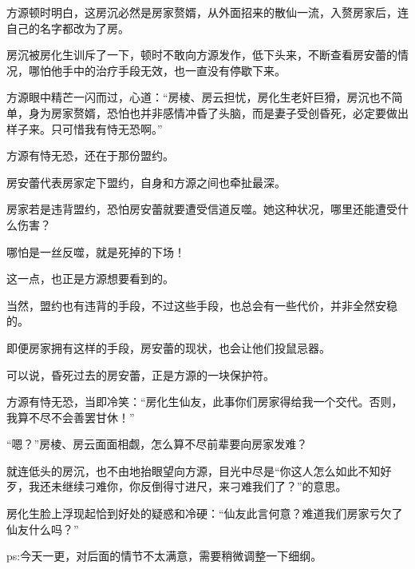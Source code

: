 \begin{this_body}
方源顿时明白，这房沉必然是房家赘婿，从外面招来的散仙一流，入赘房家后，连自己的名字都改为了房。

房沉被房化生训斥了一下，顿时不敢向方源发作，低下头来，不断查看房安蕾的情况，哪怕他手中的治疗手段无效，也一直没有停歇下来。

方源眼中精芒一闪而过，心道：“房棱、房云担忧，房化生老奸巨猾，房沉也不简单，身为房家赘婿，恐怕也并非感情冲昏了头脑，而是妻子受创昏死，必定要做出样子来。只可惜我有恃无恐啊。”

方源有恃无恐，还在于那份盟约。

房安蕾代表房家定下盟约，自身和方源之间也牵扯最深。

房家若是违背盟约，恐怕房安蕾就要遭受信道反噬。她这种状况，哪里还能遭受什么伤害？

哪怕是一丝反噬，就是死掉的下场！

这一点，也正是方源想要看到的。

当然，盟约也有违背的手段，不过这些手段，也总会有一些代价，并非全然安稳的。

即便房家拥有这样的手段，房安蕾的现状，也会让他们投鼠忌器。

可以说，昏死过去的房安蕾，正是方源的一块保护符。

方源有恃无恐，当即冷笑：“房化生仙友，此事你们房家得给我一个交代。否则，我算不尽不会善罢甘休！”

“嗯？”房棱、房云面面相觑，怎么算不尽前辈要向房家发难？

就连低头的房沉，也不由地抬眼望向方源，目光中尽是“你这人怎么如此不知好歹，我还未继续刁难你，你反倒得寸进尺，来刁难我们了？”的意思。

房化生脸上浮现起恰到好处的疑惑和冷硬：“仙友此言何意？难道我们房家亏欠了仙友什么吗？”

ps:今天一更，对后面的情节不太满意，需要稍微调整一下细纲。

\end{this_body}

